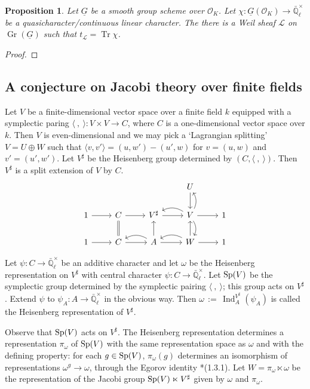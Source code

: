 \documentclass[10pt]{amsart}
\theoremstyle{plain}
\newtheorem{proposition}[theorem]{Proposition}
\theoremstyle{definition}
\newcommand{\EE}{\mathbb{\bar Q}_\ell}
\newcommand{\OK}{\mathcal{O}_K}
\newcommand{\Fq}{k}
\newcommand{\EEx}{\EE^\times}
\DeclareMathOperator{\Gr}{Gr}
\DeclareMathOperator{\trace}{Tr}
\newcommand{\ceq}{{\, :=\, }}
\newcommand{\trFrob}[1]{t_{#1}}
\newcommand{\cs}[1]{{\mathcal{#1}}}
\begin{document}
\begin{proposition}\label{prop:quasicharacters}
Let $\underline{G}$ be a smooth group scheme over $\OK$.
Let $\chi : \underline{G}(\OK) \to \EEx$ be a quasicharacter/continuous linear character. 
The there is a Weil sheaf $\cs{L}$ on $\Gr(\underline{G})$ such that $\trFrob{\cs{L}} = \trace \chi$. 
\end{proposition}

\begin{proof}
\end{proof}


\subsection{A conjecture on Jacobi theory over finite fields}\label{sec:Jacobi}


Let $V$ be a finite-dimensional vector space over a finite field $\Fq$ equipped with a symplectic paring $\langle\ ,\ \rangle : V\times V \to C$, where $C$ is a one-dimensional vector space over $\Fq$.
Then $V$ is even-dimensional and we may pick a `Lagrangian splitting' $V = U \oplus W$ such that $\langle v,v' \rangle = (u,w') - (u',w)$ for $v=(u,w)$ and $v'=(u',w')$.
Let $V^\sharp$ be the Heisenberg group determined by $(C, \langle\ ,\ \rangle)$.
Then $V^\sharp$ is a split extension of $V$ by $C$.
\[
\begin{tikzcd}
\ &&& U \arrow{d} &\\
1 \arrow{r} & C \arrow{r} & V^\sharp \arrow{r} & \arrow[bend right]{l} V \arrow[bend right]{u} \arrow[bend left]{d} \arrow{r} & 1\\
1 \arrow{r} & \arrow[equals]{u} C \arrow{r} & \arrow[bend right]{l}  A \arrow{u} \arrow{r} & \arrow[bend right]{l}  W \arrow{u} \arrow{r} & 1 
\end{tikzcd}
\]

Let $\psi : C \to \EEx$ be an additive character and let $\omega$ be the Heisenberg representation on $V^\sharp$ with central character $\psi : C \to \EEx$. 
Let ${\operatorname{Sp}}(V)$ be the symplectic group determined by the symplectic pairing $\langle\ ,\ \rangle$;
this group acts on $V^\sharp$.
Extend $\psi$ to $\psi_A : A \to \EEx$ in the obvious way. 
Then $\omega \ceq \operatorname{Ind}_A^{V^\sharp}(\psi_A)$ is called the Heisenberg representation of $V^\sharp$.

Observe that ${\operatorname{Sp}}(V)$ acts on $V^\sharp$.
The Heisenberg representation determines a representation $\pi_{\omega}$ of ${\operatorname{Sp}}(V)$ with the same representation space as $\omega$ and with the defining property: for each $g\in {\operatorname{Sp}}(V)$, $\pi_\omega(g)$ determines an isomorphism of representations $\omega^g \to \omega$, through the Egorov identity \cite{Gurevich-Hadani:geometric_Weil}*{(1.3.1)}.
Let $W = \pi_\omega \ltimes \omega$ be the representation of the Jacobi group ${\operatorname{Sp}}(V)\ltimes V^\sharp$ given by $\omega$ and $\pi_\omega$.
\end{document}
